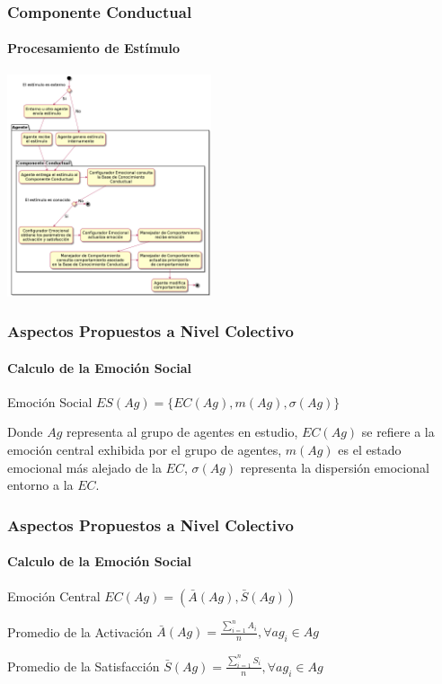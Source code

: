 \documentclass{beamer}
\begin{document}
\begin{frame}
\frametitle{Componente Conductual}
\framesubtitle{Procesamiento de Estímulo}
\centering
\includegraphics[width=6cm]{ilustraciones/procesamiento-estimulo}
\end{frame}

\begin{frame}
\frametitle{Aspectos Propuestos a Nivel Colectivo}
\framesubtitle{Calculo de la Emoción Social}
\begin{exampleblock}{Emoción Social}
$ES(Ag) = \{EC(Ag), m(Ag), \sigma(Ag)\}$
\end{exampleblock}

Donde $Ag$ representa al grupo de agentes en estudio, $EC(Ag)$ se refiere a la
emoción central exhibida por el grupo de agentes, $m(Ag)$ es el estado emocional
más alejado de la $EC$, $\sigma(Ag)$ representa la dispersión emocional entorno
a la $EC$.
\end{frame}

\begin{frame}
\frametitle{Aspectos Propuestos a Nivel Colectivo}
\framesubtitle{Calculo de la Emoción Social}
\begin{exampleblock}{Emoción Central}
$EC(Ag) = (\bar A(Ag), \bar S(Ag))$
\end{exampleblock}

\begin{exampleblock}{Promedio de la Activación}
$\bar A(Ag)=\frac{\sum_{i=1}^n A_i}{n}, \forall ag_i \in Ag$ \\
\end{exampleblock}

\begin{exampleblock}{Promedio de la Satisfacción}
$\bar S(Ag)=\frac{\sum_{i=1}^n S_i}{n}, \forall ag_i \in Ag$
\end{exampleblock}

\end{frame}
\end{document}
